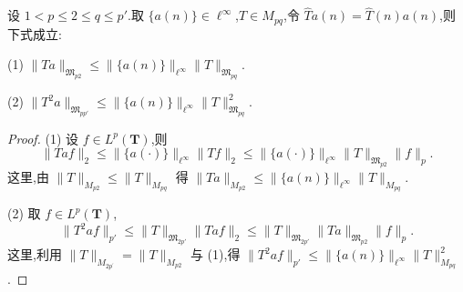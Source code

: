 \begin{lemma}\label{lem:3.5.30}
设 $1 < p \leq 2 \leq q \leq p'$.取 $\{a(n)\} \in \ell^{\infty}$,$T \in M_{pq}$,令 $\widehat{T}a(n) = \widehat{T}(n)a(n)$,则下式成立:

(1) $\|Ta\|_{\mathfrak{M}_{p2}} \leq \|\{a(n)\}\|_{\ell^{\infty}}\|T\|_{\mathfrak{M}_{pq}}$.

(2) $\|T^2a\|_{\mathfrak{M}_{pp'}} \leq \|\{a(n)\}\|_{\ell^{\infty}}\|T\|_{\mathfrak{M}_{pq}}^{2}$.
\end{lemma}

\begin{proof}
(1) 设 $f \in L^{p}(\mathbf{T})$,则
\begin{equation*}
\|Taf\|_{2} \leq \|\{a(\cdot)\}\|_{\ell^{\infty}}\|Tf\|_{2} \leq \|\{a(\cdot)\}\|_{\ell^{\infty}}\|T\|_{\mathfrak{M}_{p2}}\|f\|_{p}.
\end{equation*}
这里,由 $\|T\|_{M_{p2}} \leq \|T\|_{M_{pq}}$ 得 $\|Ta\|_{M_{p2}} \leq \|\{a(n)\}\|_{\ell^{\infty}}\|T\|_{M_{pq}}$.

(2) 取 $f \in L^{p}(\mathbf{T})$,
\begin{equation*}
\|T^{2}af\|_{p'} \leq \|T\|_{\mathfrak{M}_{2p'}}\|Taf\|_{2} \leq \|T\|_{\mathfrak{M}_{2p'}}\|Ta\|_{\mathfrak{M}_{p2}}\|f\|_{p}.
\end{equation*}
这里,利用 $\|T\|_{M_{2p^{\prime}}}=\|T\|_{M_{p2}}$ 与 (1),得 $\|T^{2}af\|_{p'}\leq\|\{a(n)\}\|_{\ell^{\infty}}\|T\|_{M_{pq}}^{2}$.
\end{proof}

